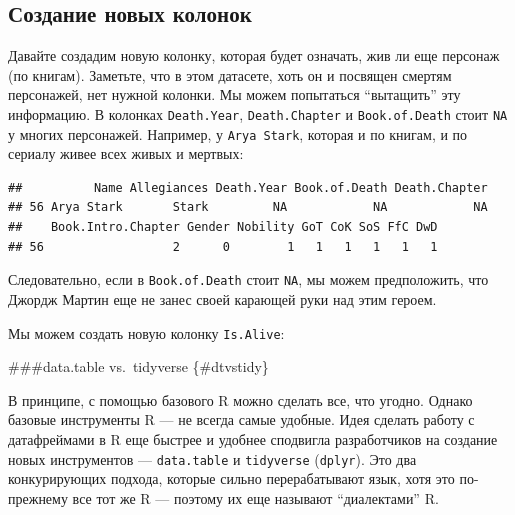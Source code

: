 \documentclass[]{book}
\newenvironment{Shaded}{\begin{snugshade}}{\end{snugshade}}
\newcommand{\KeywordTok}[1]{\textcolor[rgb]{0.13,0.29,0.53}{\textbf{#1}}}
\newcommand{\NormalTok}[1]{#1}
\newcommand{\OperatorTok}[1]{\textcolor[rgb]{0.81,0.36,0.00}{\textbf{#1}}}
\newcommand{\StringTok}[1]{\textcolor[rgb]{0.31,0.60,0.02}{#1}}
\begin{document}
\hypertarget{newcol}{%
\subsection{Создание новых колонок}\label{newcol}}

Давайте создадим новую колонку, которая будет означать, жив ли еще персонаж (по книгам).
Заметьте, что в этом датасете, хоть он и посвящен смертям персонажей, нет нужной колонки. Мы можем попытаться ``вытащить'' эту информацию. В колонках \texttt{Death.Year}, \texttt{Death.Chapter} и \texttt{Book.of.Death} стоит \texttt{NA} у многих персонажей. Например, у \texttt{Arya\ Stark}, которая и по книгам, и по сериалу живее всех живых и мертвых:

\begin{Shaded}
\end{Shaded}

\begin{verbatim}
##          Name Allegiances Death.Year Book.of.Death Death.Chapter
## 56 Arya Stark       Stark         NA            NA            NA
##    Book.Intro.Chapter Gender Nobility GoT CoK SoS FfC DwD
## 56                  2      0        1   1   1   1   1   1
\end{verbatim}

Следовательно, если в \texttt{Book.of.Death} стоит \texttt{NA}, мы можем предположить, что Джордж Мартин еще не занес своей карающей руки над этим героем.

Мы можем создать новую колонку \texttt{Is.Alive}:

\begin{Shaded}
\end{Shaded}

\#\#\#data.table vs.~tidyverse \{\#dtvstidy\}

В принципе, с помощью базового R можно сделать все, что угодно. Однако базовые инструменты R --- не всегда самые удобные. Идея сделать работу с датафреймами в R еще быстрее и удобнее сподвигла разработчиков на создание новых инструментов --- \texttt{data.table} и \texttt{tidyverse} (\texttt{dplyr}). Это два конкурирующих подхода, которые сильно перерабатывают язык, хотя это по-прежнему все тот же R --- поэтому их еще называют ``диалектами'' R.
\end{document}

